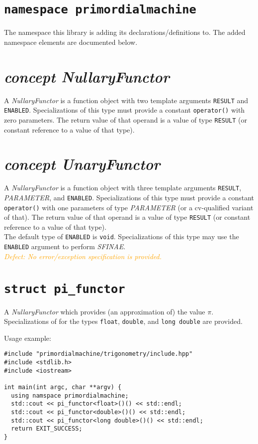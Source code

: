 \documentclass[oneside]{report}
\begin{document}
\section{\texttt{namespace primordialmachine}}
The namespace this library is adding its declarations/definitions to.
The added namespace elements are documented below.

\section{\textit{concept NullaryFunctor}}
A \textit{NullaryFunctor} is a function object with two template arguments \texttt{RESULT} and
\texttt{ENABLED}. Specializations of this type must provide a constant \verb+operator()+ with
zero parameters. The return value of that operand is a value of type \texttt{RESULT} (or constant
reference to a value of that type).\\

\section{\textit{concept UnaryFunctor}}
A \textit{NullaryFunctor} is a function object with three template arguments \texttt{RESULT},
\textit{PARAMETER}, and \texttt{ENABLED}. Specializations of this type must provide a constant
\verb+operator()+ with one parameters of type \textit{PARAMETER} (or a cv-qualified variant of
that). The return value of that operand is a value of type \texttt{RESULT} (or constant
reference to a value of that type).\\

\noindent{}The default type of \verb+ENABLED+ is \verb+void+. Specializations of this type may use
the \verb+ENABLED+ argument to perform \textit{SFINAE}.\\

\noindent{}\textcolor{orange}{\textit{Defect: No error/exception specification is provided.}}

\section{\texttt{struct pi\_functor}}
A \textit{NullaryFunctor} which provides (an approximation of) the value $\pi$.
Specializations of for the types \texttt{float}, \texttt{double}, and \texttt{long double} are provided.

\noindent{}Usage example:
\begin{verbatim}
#include "primordialmachine/trigonometry/include.hpp"
#include <stdlib.h>
#include <iostream>

int main(int argc, char **argv) {
  using namspace primordialmachine;
  std::cout << pi_functor<float>()() << std::endl;
  std::cout << pi_functor<double>()() << std::endl;
  std::cout << pi_functor<long double>()() << std::endl;  
  return EXIT_SUCCESS;
}
\end{verbatim}
\end{document}
